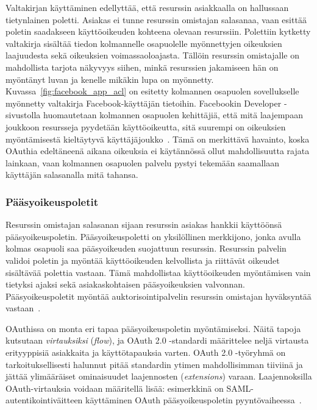 \documentclass[finnish,gradu]{tktltiki}
\begin{document}
  Valtakirjan käyttäminen edellyttää, että resurssin asiakkaalla on hallussaan tietynlainen poletti.   Asiakas ei tunne resurssin omistajan salasanaa, vaan esittää poletin saadakseen käyttöoikeuden kohteena olevaan resurssiin. Polettiin kytketty valtakirja sisältää tiedon kolmannelle osapuolelle myönnettyjen oikeuksien laajuudesta sekä oikeuksien voimassaoloajasta. Tällöin resurssin omistajalle on mahdollista tarjota näkyvyys siihen, minkä resurssien jakamiseen hän on myöntänyt luvan ja kenelle mikäkin lupa on myönnetty. Kuvassa~\ref{fig:facebook_app_acl} on esitetty kolmannen osapuolen sovellukselle myönnetty valtakirja Facebook-käyttäjän tietoihin. Facebookin Developer -sivustolla huomautetaan kolmannen osapuolen kehittäjiä, että mitä laajempaan joukkoon resursseja pyydetään käyttöoikeutta, sitä suurempi on oikeuksien myöntämisestä kieltäytyvä käyttäjäjoukko~\cite{facebook_oauth2_doc}. Tämä on merkittävä havainto, koska OAuthia edeltäneenä aikana oikeuksia ei käytännössä ollut mahdollisuutta rajata lainkaan, vaan kolmannen osapuolen palvelu pystyi tekemään saamallaan käyttäjän salasanalla mitä tahansa.


  \subsubsection{Pääsyoikeuspoletit} %
  \label{ssub:oauth_tokenit}

  Resurssin omistajan salasanan sijaan resurssin asiakas hankkii käyttöönsä pääsyoikeuspoletin. Pääsyoikeuspoletti on yksilöllinen merkkijono, jonka avulla kolmas osapuoli saa pääsyoikeuden suojattuun resurssin. Resurssin palvelin validoi poletin ja myöntää käyttöoikeuden kelvollista ja riittävät oikeudet sisältävää polettia vastaan. Tämä mahdollistaa käyttöoikeuden myöntämisen vain tietyksi ajaksi sekä asiakaskohtaisen pääsyoikeuksien valvonnan. Pääsyoikeuspoletit myöntää auktorisointipalvelin resurssin omistajan hyväksyntää vastaan~\cite{ietf_oauth2}.

  OAuthissa on monta eri tapaa pääsyoikeuspoletin myöntämiseksi. Näitä tapoja kutsutaan \emph{virtauksiksi} (\emph{flow}), ja OAuth 2.0 -standardi määrittelee neljä virtausta erityyppisiä asiakkaita ja käyttötapauksia varten. OAuth 2.0 -työryhmä on tarkoituksellisesti halunnut pitää standardin ytimen mahdollisimman tiiviinä ja jättää ylimääräiset ominaisuudet laajennosten (\emph{extensions}) varaan. Laajennoksilla OAuth-virtauksia voidaan määritellä lisää: esimerkkinä on SAML-autentikointiväitteen käyttäminen OAuth pääsyoikeuspoletin pyyntövaiheessa~\cite{ietf_oauth2_saml_bearer}.
\end{document}
